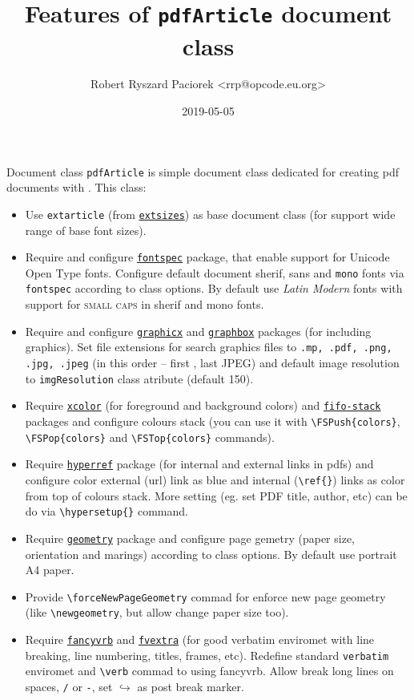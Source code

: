 \documentclass[ fontSize=10pt, ]{pdfArticle}
\title {Features of \texttt{pdfArticle} document class}
\author{Robert Ryszard Paciorek <rrp@opcode.eu.org>}
\date  {2019-05-05}
\newcommand{\pkgLink}[1]{\texttt{\href{https://ctan.org/pkg/#1}{#1}}}
\begin{document}
\maketitle\thispagestyle{empty}

Document class \texttt{pdfArticle} is simple document class dedicated for creating pdf documents with .
This class:
\begin{itemize}
\item Use \texttt{extarticle} (from \pkgLink{extsizes}) as base document class (for support wide range of base font sizes).
\item Require and configure \pkgLink{fontspec} package, that enable support for Unicode Open Type fonts.
      Configure default document \textrm{sherif}, \textsf{sans} and \texttt{mono} fonts via \texttt{fontspec} according to class options.
      By default use \textit{Latin Modern} fonts with support for \textsc{small caps} in sherif and mono fonts.
\item Require and configure \pkgLink{graphicx} and \pkgLink{graphbox} packages (for including graphics).
      Set file extensions for search graphics files to \texttt{.mp, .pdf, .png, .jpg, .jpeg} (in this order -- first , last JPEG) and default image resolution to \texttt{imgResolution} class atribute (default 150).
\item Require \pkgLink{xcolor} (for foreground and background colors) and \pkgLink{fifo-stack} packages and configure colours stack (you can use it with \Verb$\FSPush{colors}$, \Verb$\FSPop{colors}$ and \Verb$\FSTop{colors}$ commands).
\item Require \pkgLink{hyperref} package (for internal and external links in pdfs) and configure color external (url) link as blue and internal (\Verb$\ref{}$) links as color from top of colours stack.
      More setting (eg. set PDF title, author, etc) can be do via \Verb$\hypersetup{}$ command.
\item Require \pkgLink{geometry} package and configure page gemetry (paper size, orientation and marings) according to class options. By default use portrait A4 paper.
\item Provide \Verb$\forceNewPageGeometry$ commad for enforce new page geometry (like \Verb$\newgeometry$, but allow change paper size too).
\item Require \pkgLink{fancyvrb} and \pkgLink{fvextra} (for good verbatim enviromet with line breaking, line numbering, titles, frames, etc).
      Redefine standard \Verb$verbatim$ enviromet and \Verb$\verb$ commad to using fancyvrb. Allow break long lines on spaces, \Verb$/$ or \Verb$-$, set $\hookrightarrow$ as post break marker.

\end{itemize}
\end{document}
